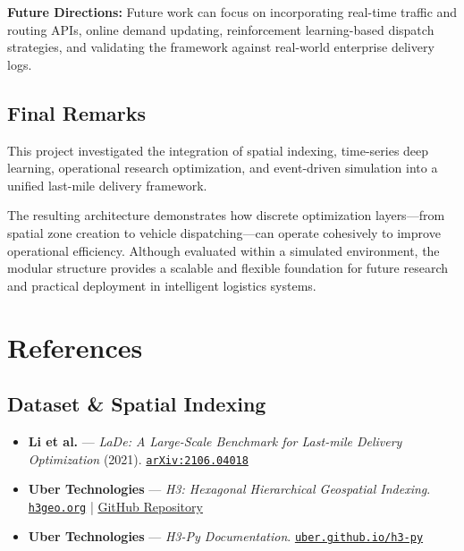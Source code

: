 \documentclass{article}
\begin{document}
\textbf{Future Directions:} Future work can focus on incorporating real-time traffic and routing APIs, online demand updating, reinforcement learning-based dispatch strategies, and validating the framework against real-world enterprise delivery logs.

\subsection{Final Remarks}
This project investigated the integration of spatial indexing, time-series deep learning, operational research optimization, and event-driven simulation into a unified last-mile delivery framework. 

The resulting architecture demonstrates how discrete optimization layers—from spatial zone creation to vehicle dispatching—can operate cohesively to improve operational efficiency. Although evaluated within a simulated environment, the modular structure provides a scalable and flexible foundation for future research and practical deployment in intelligent logistics systems.

\newpage
\section*{References}

\subsection*{Dataset \& Spatial Indexing}
\begin{itemize}
    \item \textbf{Li et al.} --- \textit{LaDe: A Large-Scale Benchmark for Last-mile Delivery Optimization} (2021). \href{https://arxiv.org/abs/2106.04018}{\nolinkurl{arXiv:2106.04018}}
    \item \textbf{Uber Technologies} --- \textit{H3: Hexagonal Hierarchical Geospatial Indexing}. \href{https://h3geo.org/}{\nolinkurl{h3geo.org}} | \href{https://github.com/uber/h3}{GitHub Repository}
    \item \textbf{Uber Technologies} --- \textit{H3-Py Documentation}. \href{https://uber.github.io/h3-py/}{\nolinkurl{uber.github.io/h3-py}}
\end{itemize}
\end{document}
